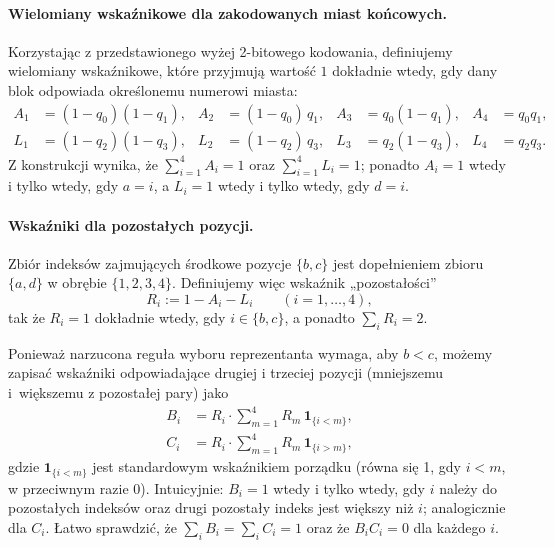 \paragraph{Wielomiany wskaźnikowe dla zakodowanych miast końcowych.}

Korzystając z przedstawionego wyżej 2-bitowego kodowania, definiujemy wielomiany wskaźnikowe, które przyjmują wartość \(1\) dokładnie wtedy, gdy dany blok odpowiada określonemu numerowi miasta:
\begin{equation}
\begin{aligned}
A_1 &= (1-q_0)(1-q_1), & A_2 &= (1-q_0)\,q_1, & A_3 &= q_0(1-q_1), & A_4 &= q_0 q_1,\\[4pt]
L_1 &= (1-q_2)(1-q_3), & L_2 &= (1-q_2)\,q_3, & L_3 &= q_2(1-q_3), & L_4 &= q_2 q_3.
\end{aligned}
\end{equation}
Z konstrukcji wynika, że \(\sum_{i=1}^4 A_i = 1\) oraz \(\sum_{i=1}^4 L_i = 1\); ponadto \(A_i = 1\) wtedy i tylko wtedy, gdy \(a = i\), a \(L_i = 1\) wtedy i tylko wtedy, gdy \(d = i\).

\paragraph{Wskaźniki dla pozostałych pozycji.}

Zbiór indeksów zajmujących środkowe pozycje \(\{b,c\}\) jest dopełnieniem zbioru \(\{a,d\}\) w obrębie \(\{1,2,3,4\}\). Definiujemy więc wskaźnik „pozostałości”
\begin{equation}
R_i := 1 - A_i - L_i \qquad (i=1,\dots,4),
\end{equation}
tak że \(R_i = 1\) dokładnie wtedy, gdy \(i \in \{b,c\}\), a ponadto \(\sum_i R_i = 2\).

Ponieważ narzucona reguła wyboru reprezentanta wymaga, aby \(b < c\), możemy zapisać wskaźniki odpowiadające drugiej i trzeciej pozycji (mniejszemu i~większemu z pozostałej pary) jako
\begin{equation}
\begin{aligned}
B_i &= R_i \cdot \sum_{m=1}^4 R_m\,\mathbf{1}_{\{i<m\}},\\[4pt]
C_i &= R_i \cdot \sum_{m=1}^4 R_m\,\mathbf{1}_{\{i>m\}},
\end{aligned}
\end{equation}
gdzie \(\mathbf{1}_{\{i<m\}}\) jest standardowym wskaźnikiem porządku (równa się 1, gdy \(i<m\), w przeciwnym razie 0). Intuicyjnie: \(B_i = 1\) wtedy i tylko wtedy, gdy \(i\) należy do pozostałych indeksów oraz drugi pozostały indeks jest większy niż \(i\); analogicznie dla \(C_i\). Łatwo sprawdzić, że \(\sum_i B_i = \sum_i C_i = 1\) oraz że \(B_i C_i = 0\) dla każdego \(i\).

